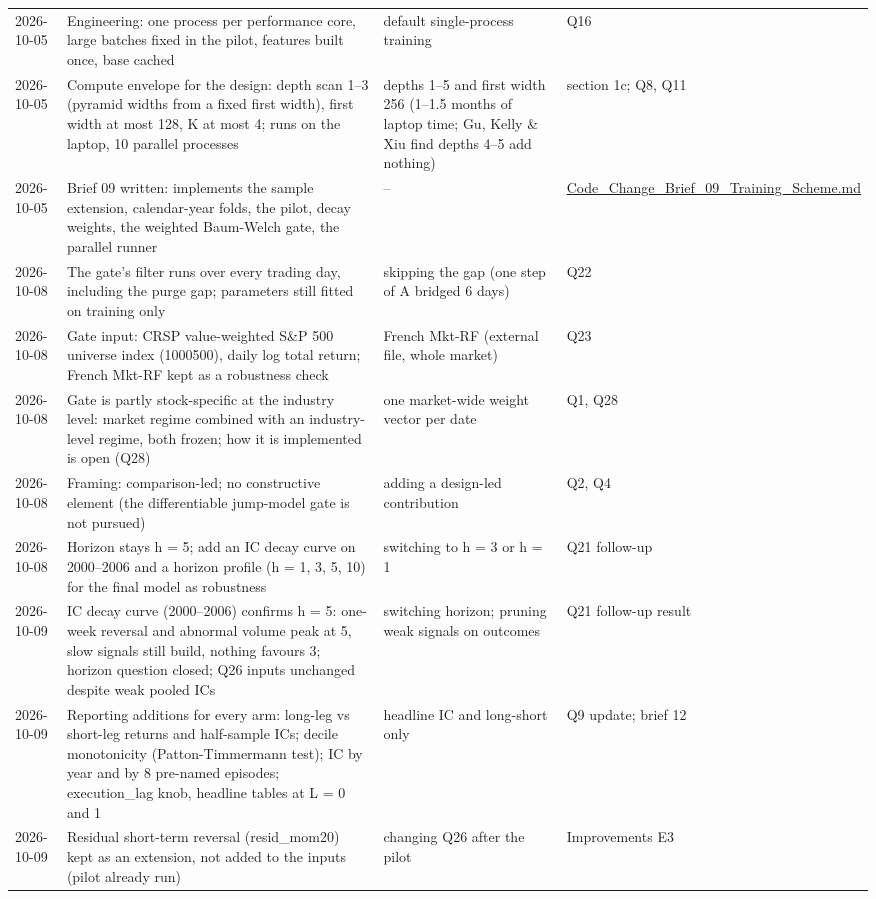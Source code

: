 {\begin{longtable}{@{}p{1.55cm}>{\raggedright\arraybackslash}p{6.6cm}>{\raggedright\arraybackslash}p{4.2cm}>{\raggedright\arraybackslash}p{2.6cm}@{}}
2026-10-05 & Engineering: one process per performance core, large batches fixed in the pilot, features built once, base cached & default single-process training & Q16\\
2026-10-05 & Compute envelope for the design: depth scan 1--3 (pyramid widths from a fixed first width), first width at most 128, K at most 4; runs on the laptop, 10 parallel processes & depths 1--5 and first width 256 (1--1.5 months of laptop time; Gu, Kelly \& Xiu find depths 4--5 add nothing) & section 1c; Q8, Q11\\
2026-10-05 & Brief 09 written: implements the sample extension, calendar-year folds, the pilot, decay weights, the weighted Baum-Welch gate, the parallel runner & -- & \url{Code_Change_Brief_09_Training_Scheme.md}\\
2026-10-08 & The gate's filter runs over every trading day, including the purge gap; parameters still fitted on training only & skipping the gap (one step of A bridged 6 days) & Q22\\
2026-10-08 & Gate input: CRSP value-weighted S\&P 500 universe index (1000500), daily log total return; French Mkt-RF kept as a robustness check & French Mkt-RF (external file, whole market) & Q23\\
2026-10-08 & Gate is partly stock-specific at the industry level: market regime combined with an industry-level regime, both frozen; how it is implemented is open (Q28) & one market-wide weight vector per date & Q1, Q28\\
2026-10-08 & Framing: comparison-led; no constructive element (the differentiable jump-model gate is not pursued) & adding a design-led contribution & Q2, Q4\\
2026-10-08 & Horizon stays h = 5; add an IC decay curve on 2000--2006 and a horizon profile (h = 1, 3, 5, 10) for the final model as robustness & switching to h = 3 or h = 1 & Q21 follow-up\\
2026-10-09 & IC decay curve (2000--2006) confirms h = 5: one-week reversal and abnormal volume peak at 5, slow signals still build, nothing favours 3; horizon question closed; Q26 inputs unchanged despite weak pooled ICs & switching horizon; pruning weak signals on outcomes & Q21 follow-up result\\
2026-10-09 & Reporting additions for every arm: long-leg vs short-leg returns and half-sample ICs; decile monotonicity (Patton-Timmermann test); IC by year and by 8 pre-named episodes; execution\_lag knob, headline tables at L = 0 and 1 & headline IC and long-short only & Q9 update; brief 12\\
2026-10-09 & Residual short-term reversal (resid\_mom20) kept as an extension, not added to the inputs (pilot already run) & changing Q26 after the pilot & Improvements E3\\
\bottomrule
\end{longtable}}

